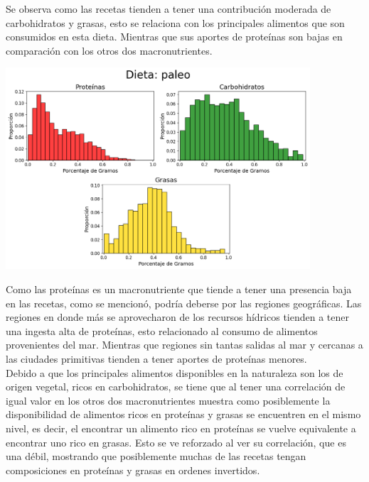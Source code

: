 \documentclass[12pt,a4paper]{article}
\begin{document}
            Se observa como las recetas tienden a tener una contribución moderada de 
            carbohidratos y grasas, esto se relaciona con los principales alimentos 
            que son consumidos en esta dieta. Mientras que sus aportes de proteínas 
            son bajas en comparación con los otros dos macronutrientes.
            
            \begin{center}
                \includegraphics[width=0.85\textwidth]{Resources/2_03_plot_04.png}
            \end{center}

            Como las proteínas es un macronutriente que tiende a tener una presencia 
            baja en las recetas, como se mencionó, podría deberse por las regiones geográficas. 
            Las regiones en donde más se aprovecharon de los recursos hídricos tienden a tener 
            una ingesta alta de proteínas, esto relacionado al consumo de alimentos provenientes 
            del mar. Mientras que regiones sin tantas salidas al mar y cercanas a las ciudades 
            primitivas tienden a tener aportes de proteínas	menores.\\

            Debido a que los principales alimentos disponibles en la naturaleza son los de 
            origen vegetal, ricos en carbohidratos, se tiene que al tener una correlación de 
            igual valor en los otros dos macronutrientes muestra como posiblemente la disponibilidad 
            de alimentos ricos en proteínas y grasas se encuentren en el mismo nivel, es decir, 
            el encontrar un alimento rico en proteínas se vuelve equivalente a encontrar uno rico 
            en grasas. Esto se ve reforzado al ver su correlación, que es una débil, mostrando que 
            posiblemente muchas de las recetas tengan composiciones en proteínas y grasas en ordenes 
            invertidos.
\end{document}
